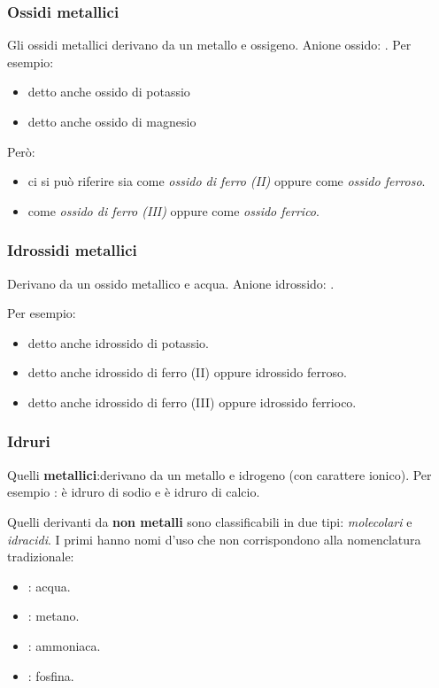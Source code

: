 
\subsubsection{Ossidi metallici}
Gli ossidi metallici derivano da un metallo e ossigeno. 
Anione ossido: .
Per esempio: 
\begin{itemize}
    \item {} detto anche ossido di potassio
    \item {} detto anche ossido di magnesio
\end{itemize}
Però:
\begin{itemize}
    \item {} ci si può riferire sia come \emph{ossido di ferro (II)} oppure come \emph{ossido ferroso}.
    \item {} come \emph{ossido di ferro (III)} oppure come \emph{ossido ferrico}.
\end{itemize}


\subsubsection{Idrossidi metallici}
Derivano da un ossido metallico e acqua.
Anione idrossido: . 

Per esempio: 
\begin{itemize}
    \item {} detto anche idrossido di potassio.
    \item {} detto anche idrossido di ferro (II) oppure idrossido ferroso.
    \item {} detto anche idrossido di ferro (III) oppure idrossido ferrioco.
\end{itemize}

\subsubsection{Idruri}
Quelli \textbf{metallici}:derivano da un metallo e idrogeno (con carattere ionico). 
Per esempio :  è idruro di sodio e  è idruro di calcio.

Quelli derivanti da \textbf{non metalli} sono classificabili in due tipi: \emph{molecolari} e \emph{idracidi}.
I primi hanno nomi d'uso che non corrispondono alla nomenclatura tradizionale: 
\begin{itemize}
    \item {}: acqua.
    \item {}: metano.
    \item {}: ammoniaca.
    \item {}: fosfina.
\end{itemize}

